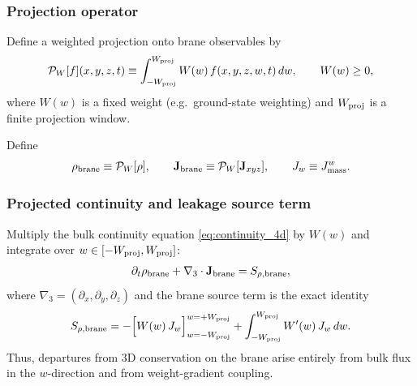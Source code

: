 \documentclass[11pt]{article}
\begin{document}
\subsubsection{Projection operator}
Define a weighted projection onto brane observables by
\begin{align}
\mathcal{P}_W[f](x,y,z,t) \equiv \int_{-W_{\rm proj}}^{W_{\rm proj}} W(w)\,f(x,y,z,w,t)\,dw,
\qquad W(w)\ge 0,
\label{eq:PW_def}
\end{align}
where $W(w)$ is a fixed weight (e.g.\ ground-state weighting) and $W_{\rm proj}$ is a
finite projection window.

Define
\begin{align}
\rho_{\rm brane} \equiv \mathcal{P}_W[\rho],
\qquad
\mathbf{J}_{\rm brane}\equiv \mathcal{P}_W[\mathbf{J}_{xyz}],
\qquad
J_{w}\equiv J^w_{\rm mass}.
\label{eq:brane_defs}
\end{align}

\subsubsection{Projected continuity and leakage source term}
Multiply the bulk continuity equation \eqref{eq:continuity_4d} by $W(w)$ and integrate
over $w\in[-W_{\rm proj},W_{\rm proj}]$:
\begin{align}
\partial_t\rho_{\rm brane} + \nabla_3\cdot\mathbf{J}_{\rm brane} = S_{\rho,\rm brane},
\label{eq:brane_continuity}
\end{align}
where $\nabla_3=(\partial_x,\partial_y,\partial_z)$ and the brane source term is the
exact identity
\begin{align}
S_{\rho,\rm brane}
=
-\Big[ W(w)\,J_{w}\Big]_{w=-W_{\rm proj}}^{w=+W_{\rm proj}}
+\int_{-W_{\rm proj}}^{W_{\rm proj}} W'(w)\,J_{w}\,dw.
\label{eq:leakage_source}
\end{align}
Thus, departures from $3$D conservation on the brane arise entirely from bulk flux in
the $w$-direction and from weight-gradient coupling.
\end{document}
